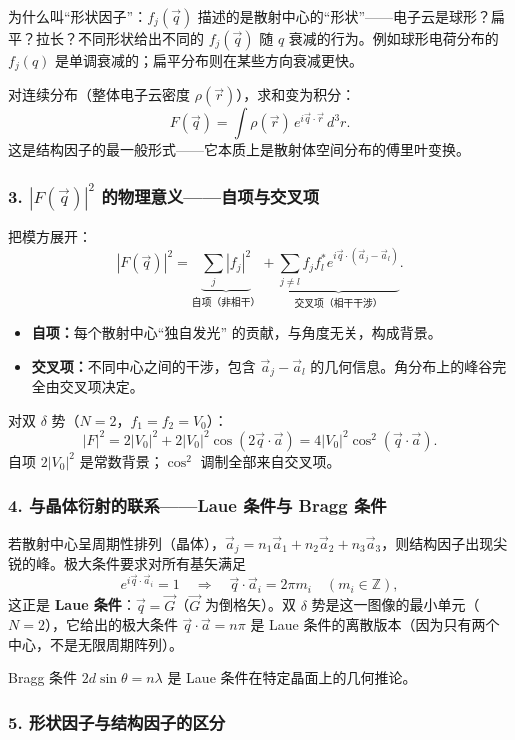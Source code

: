 \begin{derivationbox}
为什么叫``形状因子''：$f_j(\vec{q})$ 描述的是散射中心的``形状''——电子云是球形？扁平？拉长？不同形状给出不同的 $f_j(\vec{q})$ 随 $q$ 衰减的行为。例如球形电荷分布的 $f_j(q)$ 是单调衰减的；扁平分布则在某些方向衰减更快。

对连续分布（整体电子云密度 $\rho(\vec{r})$），求和变为积分：
\[
F(\vec{q}) = \int \rho(\vec{r}) \, e^{i\vec{q}\cdot\vec{r}} \, d^3r.
\]
这是结构因子的最一般形式——它本质上是散射体空间分布的傅里叶变换。

\subsubsection*{3. $|F(\vec{q})|^2$ 的物理意义——自项与交叉项}

把模方展开：
\[
|F(\vec{q})|^2 = \underbrace{\sum_j |f_j|^2}_{\text{自项（非相干）}} + \underbrace{\sum_{j\neq l} f_j f_l^* e^{i\vec{q}\cdot(\vec{a}_j - \vec{a}_l)}}_{\text{交叉项（相干干涉）}}.
\]
\begin{itemize}
    \item \textbf{自项：}每个散射中心``独自发光'' 的贡献，与角度无关，构成背景。
    \item \textbf{交叉项：}不同中心之间的干涉，包含 $\vec{a}_j - \vec{a}_l$ 的几何信息。角分布上的峰谷完全由交叉项决定。
\end{itemize}

对双 $\delta$ 势（$N = 2$，$f_1 = f_2 = V_0$）：
\[
|F|^2 = 2|V_0|^2 + 2|V_0|^2\cos(2\vec{q}\cdot\vec{a}) = 4|V_0|^2\cos^2(\vec{q}\cdot\vec{a}).
\]
自项 $2|V_0|^2$ 是常数背景；$\cos^2$ 调制全部来自交叉项。

\subsubsection*{4. 与晶体衍射的联系——Laue 条件与 Bragg 条件}

若散射中心呈周期性排列（晶体），$\vec{a}_j = n_1\vec{a}_1 + n_2\vec{a}_2 + n_3\vec{a}_3$，则结构因子出现尖锐的峰。极大条件要求对所有基矢满足
\[
e^{i\vec{q}\cdot\vec{a}_i} = 1 \quad \Longrightarrow \quad \vec{q}\cdot\vec{a}_i = 2\pi m_i \quad (m_i \in \mathbb{Z}),
\]
这正是 \textbf{Laue 条件}：$\vec{q} = \vec{G}$（$\vec{G}$ 为倒格矢）。双 $\delta$ 势是这一图像的最小单元（$N = 2$），它给出的极大条件 $\vec{q}\cdot\vec{a} = n\pi$ 是 Laue 条件的离散版本（因为只有两个中心，不是无限周期阵列）。

Bragg 条件 $2d\sin\theta = n\lambda$ 是 Laue 条件在特定晶面上的几何推论。

\subsubsection*{5. 形状因子与结构因子的区分}


\end{derivationbox}

